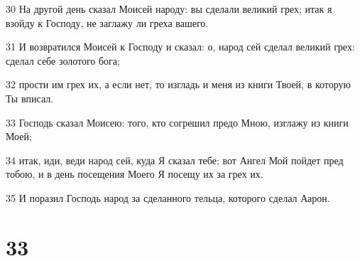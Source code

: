 \par 30 На другой день сказал Моисей народу: вы сделали великий грех; итак я взойду к Господу, не заглажу ли греха вашего.
\par 31 И возвратился Моисей к Господу и сказал: о, народ сей сделал великий грех: сделал себе золотого бога;
\par 32 прости им грех их, а если нет, то изгладь и меня из книги Твоей, в которую Ты вписал.
\par 33 Господь сказал Моисею: того, кто согрешил предо Мною, изглажу из книги Моей;
\par 34 итак, иди, веди народ сей, куда Я сказал тебе; вот Ангел Мой пойдет пред тобою, и в день посещения Моего Я посещу их за грех их.
\par 35 И поразил Господь народ за сделанного тельца, которого сделал Аарон.

\chapter{33}

